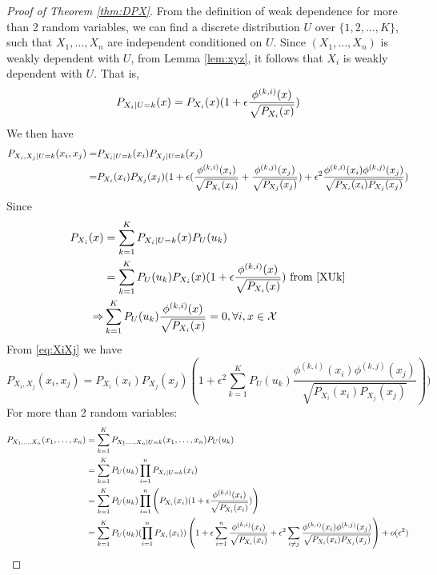 \begin{proof}[Proof of Theorem \ref{thm:DPX}]
From the definition of weak dependence for more than 2 random variables, we can find a discrete distribution $U$ over $\{1, 2,\dots, K\}$, such that $X_1, \dots, X_n$ are independent conditioned on $U$. Since $(X_1, \dots, X_n)$ is weakly dependent with $U$, from Lemma \ref{lem:xyz}, it follows that $X_i$ is weakly dependent with $U$.  That is, 
\begin{equation}\label{XUk}
P_{X_i | U=k}(x) = P_{X_i} (x)( 1 + \epsilon {\phi^{(k,i)}(x ) \over \sqrt{P_{X_i}(x)}} )
\end{equation}
We then have
\begin{align}
P_{X_i, X_j | U = k}(x_i, x_j)
=& P_{X_i | U=k}(x_i)
P_{X_j | U=k}(x_j) \notag \\
=& P_{X_i}(x_i)P_{X_j}(x_j)
(1 + \epsilon(\frac{\phi^{(k,i)}(x_i)}{\sqrt{P_{X_i}(x_i)}}
+ \frac{\phi^{(k,j)}(x_j)}{\sqrt{P_{X_j}(x_j)}}) +
\epsilon^2\frac{\phi^{(k,i)}(x_i)
\phi^{(k,j)}(x_j)}{\sqrt{P_{X_i}(x_i)P_{X_j}(x_j)}})\label{eq:XiXj}
\end{align}
Since 
\begin{align*}
P_{X_i}(x) &= \sum_{k=1}^{K} P_{X_i | U=k}(x) P_U(u_k) \\
& =  \sum_{k=1}^{K}P_U(u_k)P_{X_i} (x)( 1 + \epsilon {\phi^{(k,i)}(x ) \over \sqrt{P_{X_i}(x)}} ) \textrm{ from } \eqref{XUk}\\
\Rightarrow & \sum_{k=1}^{K} P_U(u_k){\phi^{(k, i)}(x) \over \sqrt{P_{X_i}(x)}} =0,\forall i, x\in \mathcal{X}
\end{align*}
From \eqref{eq:XiXj} we have
\begin{equation}\label{eq:PXiXj}
P_{X_i, X_j}(x_i, x_j) = P_{X_i}(x_i)
P_{X_j}(x_j) (1+\epsilon^2 \sum_{k=1}^K P_U(u_k)
\frac{\phi^{(k,i)}(x_i)
\phi^{(k,j)}(x_j)}{\sqrt{P_{X_i}(x_i)P_{X_j}(x_j)}})
)
\end{equation}
For more than 2 random variables:
\begin{align*}
P_{X_1,\dots,X_n}(x_1,\dots,x_n)  &= \sum_{k=1}^{K} P_{X_1,\dots,X_n | U=k}(x_1,\dots,x_n) P_U(u_k) \\
&=  \sum_{k=1}^{K}P_U(u_k) \prod_{i=1}^n P_{X_i|U=k}(x_i)\\
&= \sum_{k=1}^{K} P_U(u_k)\prod_{i=1}^n \left(P_{X_i} (x_i)( 1 + \epsilon {\phi^{(k,i)}(x_i ) \over \sqrt{P_{X_i}(x_i)}} )\right)\\
&=  \sum_{k=1}^{K}P_U(u_k) (\prod_{i=1}^n  P_{X_i} (x_i))
\left( 1 + \epsilon\sum_{i=1}^n {\phi^{(k,i)}(x_i) \over \sqrt{P_{X_i}(x_i)}} + \epsilon^2\sum_{i\neq j}{\phi^{(k,i)}(x_i)\phi^{(k,j)}(x_j)\over \sqrt{P_{X_i}(x_i)P_{X_j}(x_j)} }\right)+o(\epsilon^2) \\

\end{align*}
\end{proof}
